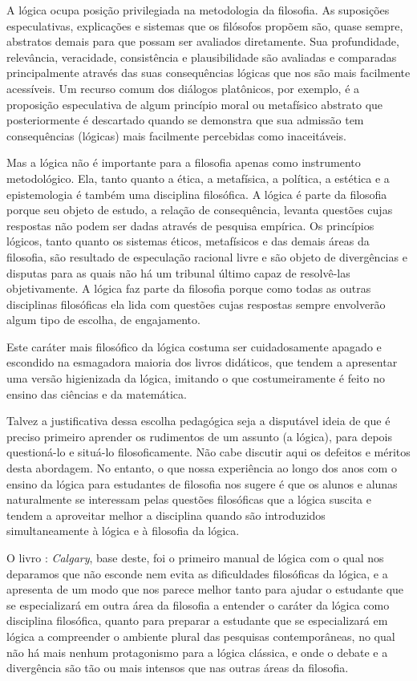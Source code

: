 A lógica ocupa posição privilegiada na metodologia da filosofia. 
As suposições especulativas, explicações e sistemas que os filósofos propõem  são, quase sempre, abstratos demais para que possam ser avaliados diretamente. 
Sua profundidade, relevância, veracidade, consistência e plausibilidade são avaliadas e comparadas principalmente através das suas consequências lógicas que nos são mais facilmente acessíveis.
Um recurso comum dos diálogos platônicos, por exemplo, é a proposição especulativa de algum princípio moral ou metafísico abstrato que posteriormente é descartado quando se demonstra que sua admissão tem consequências (lógicas) mais facilmente percebidas como inaceitáveis.

Mas a lógica não é importante para a filosofia apenas como instrumento metodológico.
Ela, tanto quanto a ética, a metafísica, a política, a estética e a epistemologia é também uma disciplina filosófica.
A lógica é parte da filosofia porque seu objeto de estudo, a relação de consequência, levanta questões cujas respostas não podem ser dadas através de pesquisa empírica.
Os princípios lógicos, tanto quanto os sistemas éticos, metafísicos e das demais áreas da filosofia, são resultado de especulação racional livre e são objeto de divergências e disputas para as quais não há um tribunal último capaz de resolvê-las objetivamente.
A lógica faz parte da filosofia porque como todas as outras disciplinas filosóficas ela lida com questões cujas respostas sempre envolverão algum tipo de escolha, de engajamento.

Este caráter mais filosófico da lógica costuma ser cuidadosamente apagado e escondido na esmagadora maioria dos livros didáticos, que tendem a apresentar uma versão higienizada da lógica, imitando o que costumeiramente é feito no ensino das ciências e da matemática.

Talvez a justificativa dessa escolha pedagógica seja a disputável ideia de que é preciso  primeiro aprender os rudimentos de um assunto (a lógica), para depois questioná-lo e situá-lo filosoficamente.
Não cabe discutir aqui os defeitos e méritos desta abordagem. 
No entanto, o que nossa experiência ao longo dos anos com o ensino da lógica para estudantes de filosofia nos sugere é que os alunos e alunas naturalmente se interessam pelas questões filosóficas que a lógica suscita e tendem a aproveitar melhor a disciplina quando são introduzidos simultaneamente à lógica e à filosofia da lógica.

O livro \forallx: \emph{Calgary}, base deste, foi o primeiro manual de lógica com o qual nos deparamos que não esconde nem evita as dificuldades filosóficas da lógica, e a apresenta de um modo que nos parece melhor tanto para ajudar o estudante que se especializará em outra área da filosofia a entender o caráter da lógica como disciplina filosófica, quanto para preparar a estudante que se especializará em lógica a compreender o ambiente plural das pesquisas contemporâneas, no qual não há mais nenhum protagonismo para a lógica clássica, e onde o debate e a divergência são tão ou mais intensos que nas outras áreas da filosofia.

